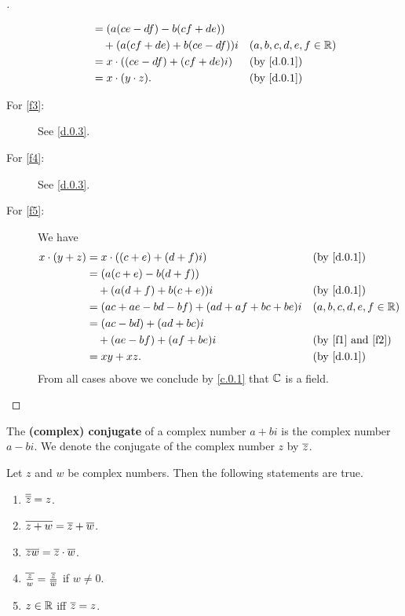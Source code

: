 \begin{proof}[]
\begin{description}
\begin{align*}
				                    & = (a (ce - df) - b (cf + de))                                        \\
				                    & \quad + (a (cf + de) + b(ce - df)) i  &  & (a, b, c, d, e, f \in \R) \\
				                    & = x \cdot ((ce - df) + (cf + de) i)   &  & \by{d.0.1}                \\
				                    & = x \cdot (y \cdot z).                &  & \by{d.0.1}
			\end{align*}
		\item[For \ref{f3}:]
			See \cref{d.0.3}.
		\item[For \ref{f4}:]
			See \cref{d.0.3}.
		\item[For \ref{f5}:]
			We have
			\begin{align*}
				x \cdot (y + z) & = x \cdot ((c + e) + (d + f) i)               &  & \by{d.0.1}                        \\
				                & = (a (c + e) - b (d + f))                                                            \\
				                & \quad + (a (d + f) + b (c + e)) i             &  & \by{d.0.1}                        \\
				                & = (ac + ae - bd - bf) + (ad + af + bc + be) i &  & (a, b, c, d, e, f \in \R)         \\
				                & = (ac - bd) + (ad + bc) i                                                            \\
				                & \quad + (ae - bf) + (af + be) i               &  & \text{(by \ref{f1} and \ref{f2})} \\
				                & = xy + xz.                                    &  & \by{d.0.1}
			\end{align*}
			From all cases above we conclude by \cref{c.0.1} that \(\mathbb{C}\) is a field.
	\end{description}
\end{proof}

\begin{defn}\label{d.0.4}
	The \textbf{(complex) conjugate} of a complex number \(a + bi\) is the complex number \(a - bi\).
	We denote the conjugate of the complex number \(z\) by \(\overline{z}\).
\end{defn}

\begin{thm}\label{d.2}
	Let \(z\) and \(w\) be complex numbers.
	Then the following statements are true.
	\begin{enumerate}
		\item \(\overline{\overline{z}} = z\).
		\item \(\overline{z + w} = \overline{z} + \overline{w}\).
		\item \(\overline{zw} = \overline{z} \cdot \overline{w}\).
		\item \(\overline{\frac{z}{w}} = \frac{\overline{z}}{\overline{w}}\) if \(w \neq 0\).
		\item \(z \in \mathbb{R}\) iff \(\overline{z} = z\).
	\end{enumerate}
\end{thm}

